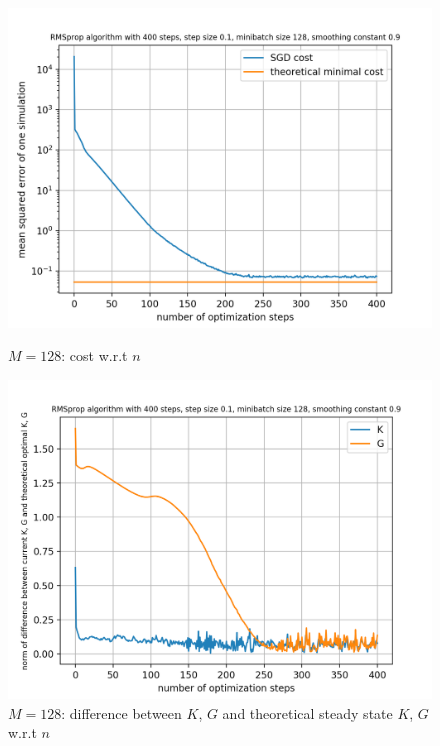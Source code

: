 \documentclass{article}
\begin{document}
\begin{figure}[h!]
	\centering
	\begin{minipage}[t]{.28\paperwidth}
		\centering
		\includegraphics[width=1.0\textwidth]{Figures/M128.png}
		\caption{$M=128$: cost w.r.t $n$}
	\end{minipage}%
	\begin{minipage}[t]{.28\paperwidth}
		\centering
		\includegraphics[width=1.0\textwidth]{Figures/d_M128.png}
		\caption{$M=128$: difference between $K$, $G$ and theoretical steady state $K$, $G$ w.r.t $n$}
	\end{minipage}%
	\begin{minipage}[t]{.28\paperwidth}
		\centering

\end{minipage}
\end{figure}
\end{document}
